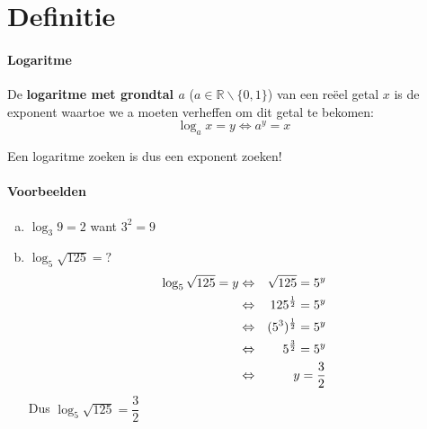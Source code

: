 \documentclass[12pt,twoside]{article}
\begin{document}
\thispagestyle{empty}
\mbox{}
\newpage
\clearpage
\thispagestyle{empty}
\tableofcontents
\newpage
\clearpage
{} 

\fancyhead[RE,LO]{}


\section{Definitie}

\paragraph{Logaritme}
\begin{mdframed}
De {\bf logaritme met grondtal $a$} ($a\in\mathbb{R}\backslash\{0,1\}$) van een reëel getal $x$ is de exponent
waartoe we a moeten verheffen om dit getal te bekomen:
$$\log_a x = y \Leftrightarrow a^y=x$$
\end{mdframed}

Een logaritme zoeken is dus een exponent zoeken!

\paragraph{Voorbeelden}
\begin{enumerate}[(a)]
  \item $\log_3 9 = 2$ want $3^2=9$
  \item $\log_5\sqrt{125} = ?$
  \begin{eqnarray*}
    \log_5\sqrt{125}=y &\Leftrightarrow& \sqrt{125} = 5^y\\
                       &\Leftrightarrow& 125^\frac{1}{2} = 5^y\\
                       &\Leftrightarrow& (5^3)^\frac{1}{2} = 5^y\\
                       &\Leftrightarrow& 5^\frac{3}{2} = 5^y\\
                       &\Leftrightarrow& y=\frac{3}{2}
  \end{eqnarray*}
  Dus $\log_5\sqrt{125} = \dfrac{3}{2}$
\end{enumerate}
\end{document}
